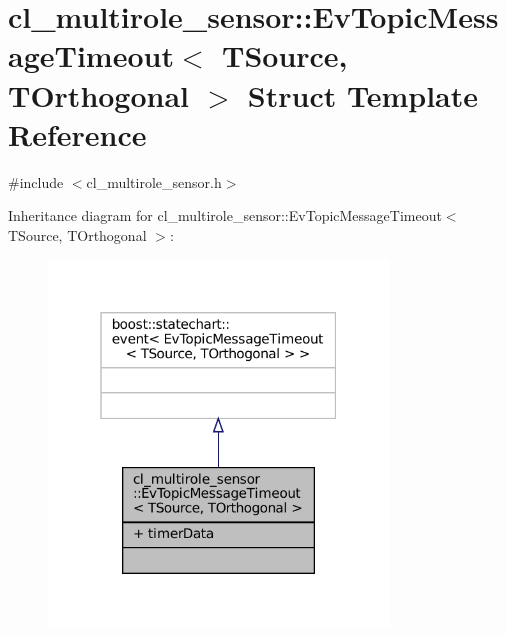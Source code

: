\hypertarget{structcl__multirole__sensor_1_1EvTopicMessageTimeout}{}\section{cl\+\_\+multirole\+\_\+sensor\+:\+:Ev\+Topic\+Message\+Timeout$<$ T\+Source, T\+Orthogonal $>$ Struct Template Reference}
\label{structcl__multirole__sensor_1_1EvTopicMessageTimeout}


{\ttfamily \#include $<$cl\+\_\+multirole\+\_\+sensor.\+h$>$}



Inheritance diagram for cl\+\_\+multirole\+\_\+sensor\+:\+:Ev\+Topic\+Message\+Timeout$<$ T\+Source, T\+Orthogonal $>$\+:
\nopagebreak
\begin{figure}[H]
\begin{center}
\leavevmode
\includegraphics[width=256pt]{structcl__multirole__sensor_1_1EvTopicMessageTimeout__inherit__graph}
\end{center}
\end{figure}


